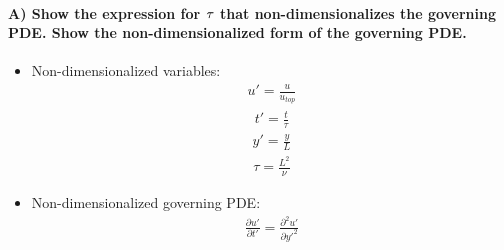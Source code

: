\documentclass[letterpaper,10pt,english]{sphinxmanual}
\begin{document}
\paragraph{A) Show the expression for \protect\(\tau\protect\) that non-dimensionalizes the governing PDE. Show the non-dimensionalized form of the governing PDE.}
\label{\detokenize{cases/results:a-show-the-expression-for-that-non-dimensionalizes-the-governing-pde-show-the-non-dimensionalized-form-of-the-governing-pde}}\begin{itemize}
\item {} 
Non-dimensionalized variables:
\begin{equation*}
\begin{split}u' = \frac{u}{u_{top}}\end{split}
\end{equation*}\begin{equation*}
\begin{split}t' = \frac{t}{\tau}\end{split}
\end{equation*}\begin{equation*}
\begin{split}y' = \frac{y}{L}\end{split}
\end{equation*}\begin{equation*}
\begin{split}\tau = \frac{L^{2}}{\nu}\end{split}
\end{equation*}
\item {} 
Non-dimensionalized governing PDE:
\begin{equation*}
\begin{split}\frac{\partial u'}{\partial t'} = \frac{\partial^{2}u'}{\partial y'^{2}}\end{split}
\end{equation*}
\end{itemize}
\end{document}
